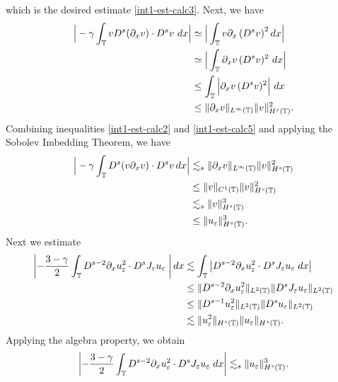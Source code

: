 %
which  is the desired estimate  \eqref{int1-est-calc3}.
Next, we have
%
%
%
\begin{equation} 
\label{int1-est-calc5}
\begin{split}
\Big|
-\gamma \int_{\mathbb{T}}
v D^s (\partial_x v)
\cdot  D^s v \ dx
\Big|
& \simeq 
 \Big|
\int_{\mathbb{T}}
v \partial_x\left(D^s v\right)^2  dx
\Big|
\\
& \simeq
\Big | \int_{\mathbb{T}}
\partial_x v \, (D^s v)^2 \ dx
\Big|
\\
& \le
\int_{\mathbb{T}}
\Big | \partial_x v \, (D^s v)^2   
\Big| \ dx
\\
& \le
\| \partial_x v \|_{L^\infty(\mathbb{T})} 
\| v \|_{H^s(\mathbb{T})}^2.
\end{split}
\end{equation}
%
%
%
Combining inequalities  \eqref{int1-est-calc2} and
\eqref{int1-est-calc5} and applying the Sobolev Imbedding Theorem, we
have
%
\begin{equation} 
\label{burgers_est'}
\begin{split}
\Big|
-\gamma \int_{\mathbb{T}}
D^s(v \partial_x v) \cdot   D^s v \, dx  
\Big|
&\lesssim_{s}
\| \partial_x v \|_{L^\infty(\mathbb{T})} 
\|  v \|_{H^s(\mathbb{T})}^2
\\
& \le  \| v \|_{C^1(\mathbb{T})} \| v \|_{H^s(\mathbb{T})}^2
\\
& \lesssim_{s}  \| v \|_{H^s(\mathbb{T})}^3
\\
& \le  \| u_\varepsilon \|_{H^s(\mathbb{T})}^3.
\end{split}
\end{equation}
%
Next we estimate
\begin{equation}
\begin{split}
\left | - \frac{3 -\gamma}{2} \int_{\mathbb{T}} D^{s-2} \partial_x u_\varepsilon^2 \cdot
D^s J_\varepsilon u_\varepsilon \; \right | dx 
& \lesssim  \int_{\mathbb{T}} \left |
D^{s-2} \partial_x u_\varepsilon^2 \cdot D^s J_\varepsilon u_\varepsilon \; dx \right | 
\\
& \le 
\|D^{s-2} \partial_x u_\varepsilon^2 \|_{L^2(\mathbb{T})} 
\|D^s J_\varepsilon u_\varepsilon \|_{L^2(\mathbb{T})}
\\
& \le 
\|D^{s-1} u_\varepsilon^2 \|_{L^2(\mathbb{T})} 
\|D^s u_\varepsilon \|_{L^2(\mathbb{T})}
\\
& \lesssim \| u_\varepsilon^2 \|_{H^s(\mathbb{T})} \| u_\varepsilon \|_{H^s(\mathbb{T})}.
\end{split}
\end{equation}
%
%
Applying the algebra property, we obtain
%
\begin{equation}
\label{hl1}
\begin{split}
\left | - \frac{3 -\gamma}{2} \int_{\mathbb{T}} D^{s-2} \partial_x u_\varepsilon^2 \cdot
D^s J_\varepsilon u_\varepsilon \; dx \right |
\lesssim_{s} \| u_\varepsilon \|_{H^s(\mathbb{T})}^3.
\end{split}
\end{equation}
